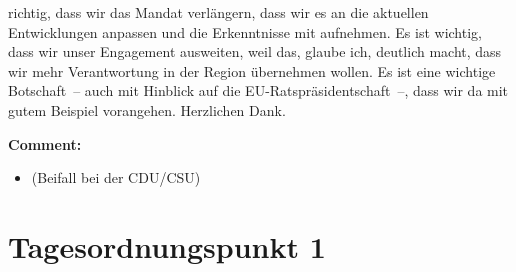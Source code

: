 \documentclass{article}
\begin{document}
richtig, dass wir das Mandat verlängern, dass wir es an die aktuellen Entwicklungen anpassen und die Erkenntnisse mit aufnehmen. Es ist wichtig, dass wir unser Engagement ausweiten, weil das, glaube ich, deutlich macht, dass wir mehr Verantwortung in der Region übernehmen wollen. Es ist eine wichtige Botschaft – auch mit Hinblick auf die EU-Ratspräsidentschaft –, dass wir da mit gutem Beispiel vorangehen. Herzlichen Dank. 

\noindent\textbf{Comment:}
\begin{itemize}
    \setlength\itemsep{-3pt}
    \item (Beifall bei der CDU/CSU)
\end{itemize}
\section{Tagesordnungspunkt 1}
\end{document}
